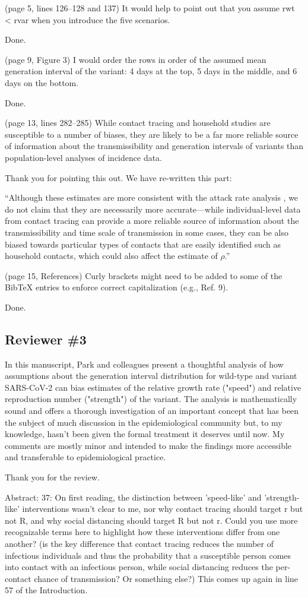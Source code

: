 \documentclass[12pt]{article}
\newcommand{\rev}{\subsection*}
\newcommand{\revtext}{\textsf}
\begin{document}
\revtext{(page 5, lines 126–128 and 137) It would help to point out that you assume
rwt < rvar when you introduce the five scenarios.}

Done.

\revtext{(page 9, Figure 3) I would order the rows in order of the assumed mean
generation interval of the variant: 4 days at the top, 5 days in the middle,
and 6 days on the bottom.}

Done.

\revtext{(page 13, lines 282–285) While contact tracing and household studies are
susceptible to a number of biases, they are likely to be a far more reliable
source of information about the transmissibility and generation intervals
of variants than population-level analyses of incidence data.}

Thank you for pointing this out. We have re-written this part:

``Although these estimates are more consistent with the attack rate analysis \citep{ukinvest},
we do not claim that they are necessarily more accurate---while individual-level data from contact tracing can provide a more reliable source of information about the transmissibility and time scale of transmission in some cases, they can be also biased towards particular types of contacts that are easily identified such as household contacts, which could also affect the estimate of $\rho$.''

\revtext{(page 15, References) Curly brackets might need to be added to some of
the BibTeX entries to enforce correct capitalization (e.g., Ref. 9).}

Done.

\rev{Reviewer \#3}

\revtext{In this manuscript, Park and colleagues present a thoughtful analysis of how assumptions about the generation interval distribution for wild-type and variant SARS-CoV-2 can bias estimates of the relative growth rate ("speed") and relative reproduction number ("strength") of the variant. The analysis is mathematically sound and offers a thorough investigation of an important concept that has been the subject of much discussion in the epidemiological community but, to my knowledge, hasn't been given the formal treatment it deserves until now. My comments are mostly minor and intended to make the findings more accessible and transferable to epidemiological practice.}

Thank you for the review.

\revtext{Abstract: 37: On first reading, the distinction between 'speed-like' and 'strength-like' interventions wasn't clear to me, nor why contact tracing should target r but not R, and why social distancing should target R but not r. Could you use more recognizable terms here to highlight how these interventions differ from one another? (is the key difference that contact tracing reduces the number of infectious individuals and thus the probability that a susceptible person comes into contact with an infectious person, while social distancing reduces the per-contact chance of transmission? Or something else?) This comes up again in line 57 of the Introduction.}
\end{document}
